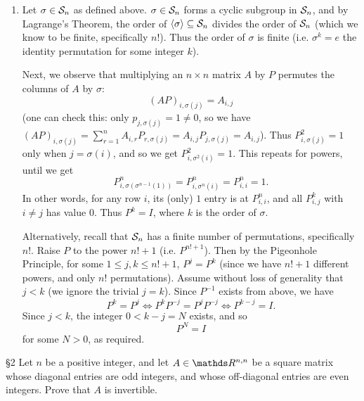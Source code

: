 \documentclass{homework}
\begin{document}
\begin{solution}
\begin{enumerate}[label=(\alph*)]
    \item Let $\sigma\in \mathcal{S}_n$ as defined above. $\sigma\in \mathcal{S}_n$ forms a cyclic subgroup in
      $\mathcal{S}_n$, and by Lagrange's Theorem, the order of $\left<\sigma \right>\subseteq \mathcal{S}_n$
      divides the order of $\mathcal{S}_n$ (which we know to be finite, specifically $n!$). Thus the
      order of $\sigma$ is finite (i.e. $\sigma^{k}=e$ the identity permutation for some integer
      $k$).

      Next, we observe that multiplying an $n\times n$ matrix $A$ by $P$ permutes the columns of $A$
      by $\sigma$: \[
        (AP)_{i,\sigma(j)}=A_{i,j}
      \] (one can check this: only $p_{j,\sigma(j)}=1\neq 0$, so we have
      $(AP)_{i,\sigma(j)}=\sum_{r=1}^{n} A_{i,r}P_{r,\sigma(j)}=A_{i,j}P_{j,\sigma(j)}=A_{i,j}$).
      Thus $P^2_{i,\sigma(j)}=1$ only when $j=\sigma(i)$, and so we get $P^2_{i,\sigma^2(i)}=1$.
      This repeats for powers, until we get \[
        P^n_{i,\sigma(\sigma^{n-1}(1))}=P^n_{i,\sigma^n(i)}=P^n_{i,i}=1
      .\] In other words, for any row $i$, its (only) $1$ entry is at $P^n_{i,i}$, and all
      $P^k_{i,j}$ with $i\neq j$ has value $0$. Thus $P^k=I$, where $k$ is the order of $\sigma$.

      Alternatively, recall that $\mathcal{S}_n$ has a finite number of permutations, specifically $n!$.
      Raise $P$ to the power $n!+1$ (i.e. $P^{n!+1}$). Then by the Pigeonhole Principle, for some
      $1\le j,k\le n!+1$, $P^j=P^k$ (since we have $n!+1$ different powers, and only $n!$
      permutations).  Assume without loss of generality that $j<k$ (we ignore the trivial $j=k$).
      Since $P^{-1}$ exists from above, we have \[
        P^k=P^j \iff P^kP^{-j}=P^jP^{-j}\iff P^{k-j}=I
      .\] Since $j<k$, the integer $0<k-j=N$ exists, and so \[
        P^N=I
      \] for some $N>0$, as required.
  \end{enumerate}
\end{solution}

\begin{problem}{\S 2}
  Let $n$ be a positive integer, and let $A\in \R^{n,n}$ be a square matrix whose diagonal entries
  are odd integers, and whose off-diagonal entries are even integers. Prove that $A$ is invertible.
\end{problem}
\end{document}
